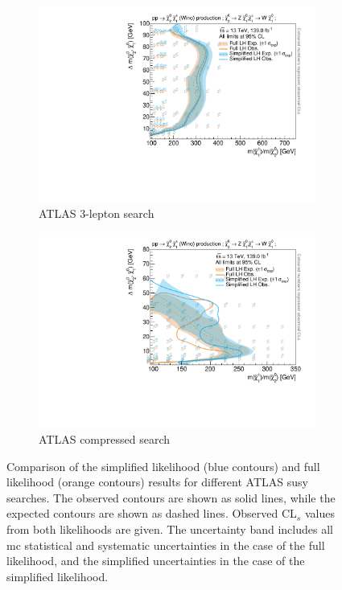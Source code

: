 \begin{figure}
\begin{subfigure}[b]{0.5\textwidth}
		\centering\includegraphics[width=\textwidth]{exclusion_3Loffshell_CLs_noLabel_v2}
		\caption{ATLAS 3-lepton search\label{fig:results_3Loffshell_CLs}}
	\end{subfigure}\hfill
	\begin{subfigure}[b]{0.5\textwidth}
		\centering\includegraphics[width=\textwidth]{exclusion_compressed_CLs_noLabel_v2}
		\caption{ATLAS compressed search~\cite{SUSY-2018-16}\label{fig:results_compressed_CLs}}
	\end{subfigure}\hfill
	\caption{Comparison of the simplified likelihood (blue contours) and full likelihood (orange contours) results for different ATLAS \gls{susy} searches. The observed contours are shown as solid lines, while the expected contours are shown as dashed lines. Observed CL$_s$ values from both likelihoods are given. The uncertainty band includes all \gls{mc} statistical and systematic uncertainties in the case of the full likelihood, and the simplified uncertainties in the case of the simplified likelihood.}\label{fig:results_analyses_CLs}
\end{figure}



